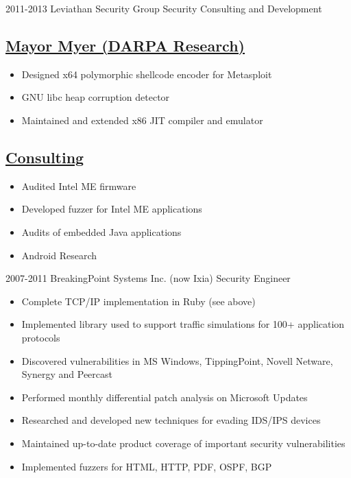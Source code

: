 \documentclass[]{friggeri-cv}
\newcommand{\heading}[1]{
  \vskip 0.05in
  \subsection{\uline{\small{#1}}}
  \vskip 0.05in
}
\begin{document}
\begin{entrylist}
{    }
  \entry
    {2011-2013}
    {Leviathan Security Group}
    {Security Consulting and Development}
    {
      \heading{Mayor Myer (DARPA Research)}
      \begin{itemize}
      \item{Designed x64 polymorphic shellcode encoder for Metasploit}
      \item{GNU libc heap corruption detector}
      \item{Maintained and extended x86 JIT compiler and emulator}
      \end{itemize}
      \heading{Consulting}
      \begin{itemize}
      \item{Audited Intel ME firmware}
      \item{Developed fuzzer for Intel ME applications}
      \item{Audits of embedded Java applications}
      \item{Android Research}
      \end{itemize}
      
    }
  \entry
    {2007-2011}
    {BreakingPoint Systems Inc. (now Ixia)}
    {Security Engineer}
    {

      \begin{itemize}
      \item{Complete TCP/IP implementation in Ruby (see above)}
      \item{Implemented library used to support traffic simulations for 100+ application protocols}
      \item{Discovered vulnerabilities in MS Windows, TippingPoint, Novell Netware, Synergy and Peercast}
      \item{Performed monthly differential patch analysis on Microsoft Updates}
      \item{Researched and developed new techniques for evading IDS/IPS devices}
      \item{Maintained up-to-date product coverage of important security vulnerabilities} 
      \item{Implemented fuzzers for HTML, HTTP, PDF, OSPF, BGP}
      \end{itemize}

}
\end{entrylist}
\end{document}
